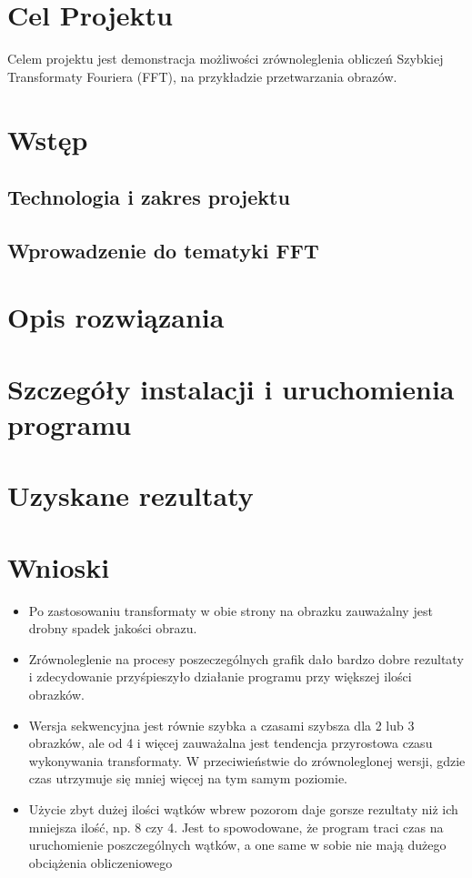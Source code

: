 \section{Cel Projektu}
Celem projektu jest demonstracja możliwości zrównoleglenia obliczeń Szybkiej Transformaty Fouriera (FFT), na przykładzie przetwarzania obrazów.
\section{Wstęp}
\subsection{Technologia i zakres projektu}
\subsection{Wprowadzenie do tematyki FFT}
\section{Opis rozwiązania}
\section{Szczegóły instalacji i uruchomienia programu}
\section{Uzyskane rezultaty}
\section{Wnioski}
\begin{itemize}
	\item Po zastosowaniu transformaty w obie strony na obrazku zauważalny jest drobny spadek jakości obrazu.
	\item Zrównoleglenie na procesy poszeczególnych grafik dało bardzo dobre rezultaty i zdecydowanie przyśpieszyło działanie programu przy większej ilości obrazków.
	\item Wersja sekwencyjna jest równie szybka a czasami szybsza dla 2 lub 3 obrazków, ale od 4 i więcej zauważalna jest tendencja przyrostowa czasu wykonywania transformaty. W przeciwieństwie do zrównoleglonej wersji, gdzie czas utrzymuje się mniej więcej na tym samym poziomie.
	\item Użycie zbyt dużej ilości wątków wbrew pozorom daje gorsze rezultaty niż ich mniejsza ilość, np. 8 czy 4. Jest to spowodowane, że program traci czas na uruchomienie poszczególnych wątków, a one same w sobie nie mają dużego obciążenia obliczeniowego
\end{itemize}

